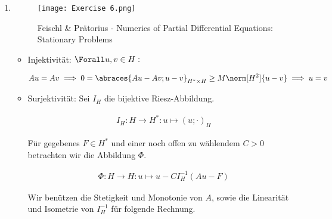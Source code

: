 \begin{solution}

\phantom{}

\begin{enumerate}[label = \textbf{\alph*)}]

  \item \phantom{}

  \begin{figure}[h!]
    \centering
    \texttt{[image: Exercise 6.png]}
    \caption{Feischl \& Prätorius - Numerics of Partial Differential Equations: Stationary Problems}
  \end{figure}

  \begin{itemize}

    \item Injektivität:
    $\Forall u, v \in H:$

    \begin{align*}
      Au = Av
      \implies
      0 = \abraces{Au - Av; u - v}_{H^\ast \times H} \geq M \norm[H^2]{u -v}
      \implies
      u = v
    \end{align*}

    \item Surjektivität:
    Sei $I_H$ die bijektive Riesz-Abbildung.

    \begin{align*}
      I_H:
      H \to H^\ast:
      u \mapsto (u; \cdot)_H
    \end{align*}

    Für gegebenes $F \in H^\ast$ und einer noch offen zu wählendem $C > 0$ betrachten wir die Abbildung $\Phi$.

    \begin{align*}
      \Phi:
      H \to H:
      u \mapsto u - C I_H^{-1}(Au - F)
    \end{align*}

    Wir benützen die Stetigkeit und Monotonie von $A$, sowie die Linearität und Isometrie von $I_H^{-1}$ für folgende Rechnung.


\end{itemize}
\end{enumerate}
\end{solution}
